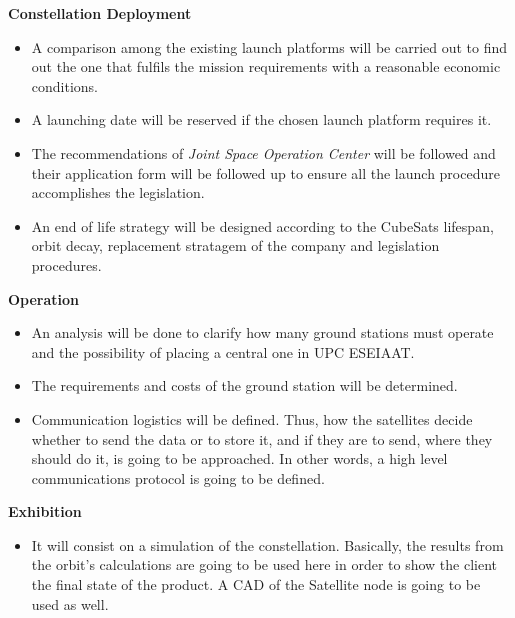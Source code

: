 {\bfseries Constellation Deployment} 

\begin{itemize}
	\item A comparison among the existing launch platforms will be carried out to find out the
one that fulfils the mission requirements with a reasonable economic conditions.
	\item A launching date will be reserved if the chosen launch platform requires it.
	\item The recommendations of \textit{Joint Space Operation Center} will be followed and their application form will be followed up to ensure all the launch procedure accomplishes the legislation.
 	\item An end of life strategy will be designed according to the CubeSats lifespan, orbit decay,
replacement stratagem of the company and legislation procedures.
\end{itemize}

{\bfseries Operation} 

\begin{itemize}
	\item An analysis will be done to clarify how many ground stations must operate and the possibility of placing a central one in UPC ESEIAAT.
	\item The requirements and costs of the ground station will be determined. 
	\item Communication logistics will be defined. Thus, how the satellites decide whether to send the data or to store it, and if they are to send, where they should do it, is going to be approached. In other words, a high level communications protocol is going to be defined. 
\end{itemize}

{\bfseries Exhibition}

\begin{itemize}
	\item It will consist on a simulation of the constellation. Basically, the results from the orbit's calculations are going to be used here in order to show the client the final state of the product. A CAD of the Satellite node is going to be used as well.

\end{itemize}
